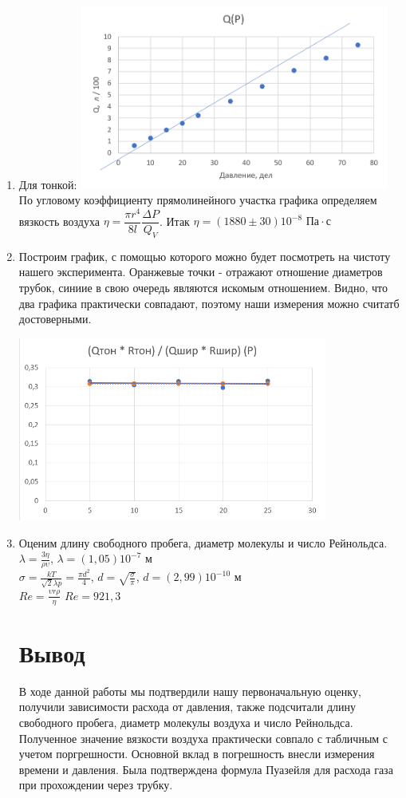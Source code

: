 \documentclass[a4paper, 12pt]{article}%
\begin{document}
\begin{enumerate}
\item Для тонкой:
\includegraphics[width = 0.8\textwidth]{тонкая.png}
По угловому коэффициенту прямолинейного участка графика определяем вязкость воздуха $\eta = \dfrac{\pi r^4}{8l} \dfrac{\Delta P}{Q_V}$. Итак $\eta = (1880 \pm 30)10^{-8} \text{ Па} \cdot \text{с}$

\item Построим график, с помощью которого можно будет посмотреть на чистоту нашего эксперимента. Оранжевые точки - отражают отношение диаметров трубок, синиие в свою очередь являются искомым отношением. Видно, что два графика практически совпадают, поэтому наши измерения можно считатб достоверными.

\includegraphics[width = 0.8\textwidth]{отношение.png}

\item Оценим длину свободного пробега, диаметр молекулы и число Рейнольдса. 
$\lambda = \frac{3 \eta}{\rho \upsilon}$, $\lambda = (1,05) 10^{-7} \text{ м}$  \\
$\sigma  = \frac{k T}{\sqrt{2} \lambda p } = \frac{\pi d^{2}}{4}$, $d = \sqrt{\frac{\sigma}{\pi}}$, $d = (2,99)10^{-10} \text{ м}$ \\
$ Re = \frac{\upsilon r \rho}{\eta} $ $Re = 921,3$

\section*{Вывод}
В ходе данной работы мы подтвердили нашу первоначальную оценку, получили зависимости расхода от давления, также подсчитали длину свободного пробега, диаметр молекулы воздуха и число Рейнольдса. Полученное значение вязкости воздуха практически совпало с табличным с учетом поргрешности. Основной вклад в погрешность внесли измерения времени и давления. Была подтверждена формула Пуазейля для расхода газа при прохождении через трубку.
\end{enumerate}
\end{document}
